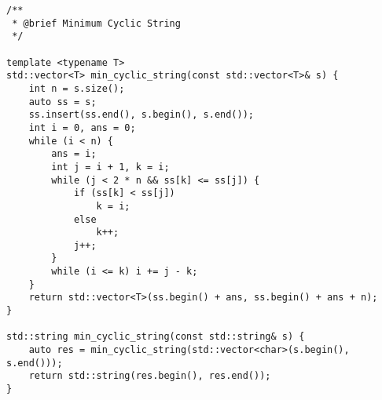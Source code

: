 \begin{lstlisting}
/**
 * @brief Minimum Cyclic String
 */

template <typename T>
std::vector<T> min_cyclic_string(const std::vector<T>& s) {
    int n = s.size();
    auto ss = s;
    ss.insert(ss.end(), s.begin(), s.end());
    int i = 0, ans = 0;
    while (i < n) {
        ans = i;
        int j = i + 1, k = i;
        while (j < 2 * n && ss[k] <= ss[j]) {
            if (ss[k] < ss[j])
                k = i;
            else
                k++;
            j++;
        }
        while (i <= k) i += j - k;
    }
    return std::vector<T>(ss.begin() + ans, ss.begin() + ans + n);
}

std::string min_cyclic_string(const std::string& s) {
    auto res = min_cyclic_string(std::vector<char>(s.begin(), s.end()));
    return std::string(res.begin(), res.end());
}

\end{lstlisting}